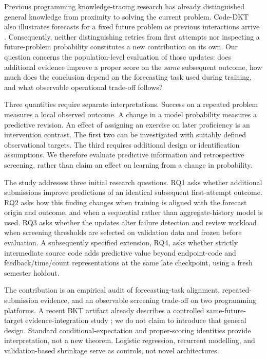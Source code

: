 \documentclass[11pt]{article}
\newcommand{\1}{\mathbb{I}}
\begin{document}
Previous programming knowledge-tracing research has already distinguished general knowledge from proximity to solving the current problem. Code-DKT also illustrates forecasts for a fixed future problem as previous interactions arrive \cite{shi2022codedkt}. Consequently, neither distinguishing retries from first attempts nor inspecting a future-problem probability constitutes a new contribution on its own. Our question concerns the population-level evaluation of those updates: does additional evidence improve a proper score on the \emph{same} subsequent outcome, how much does the conclusion depend on the forecasting task used during training, and what observable operational trade-off follows?

Three quantities require separate interpretations. Success on a repeated problem measures a local observed outcome. A change in a model probability measures a predictive revision. An effect of assigning an exercise on later proficiency is an intervention contrast. The first two can be investigated with suitably defined observational targets. The third requires additional design or identification assumptions. We therefore evaluate predictive information and retrospective screening, rather than claim an effect on learning from a change in probability.

The study addresses three initial research questions. RQ1 asks whether additional submissions improve predictions of an identical subsequent first-attempt outcome. RQ2 asks how this finding changes when training is aligned with the forecast origin and outcome, and when a sequential rather than aggregate-history model is used. RQ3 asks whether the updates alter failure detection and review workload when screening thresholds are selected on validation data and frozen before evaluation. A subsequently specified extension, RQ4, asks whether strictly intermediate source code adds predictive value beyond endpoint-code and feedback/time/count representations at the same late checkpoint, using a fresh semester holdout.

The contribution is an empirical audit of forecasting-task alignment, repeated-submission evidence, and an observable screening trade-off on two programming platforms. A recent BKT artifact already describes a controlled same-future-target evidence-integration study \cite{hoa2026stepbkt}; we do not claim to introduce that general design. Standard conditional-expectation and proper-scoring identities provide interpretation, not a new theorem. Logistic regression, recurrent modelling, and validation-based shrinkage serve as controls, not novel architectures.
\end{document}
